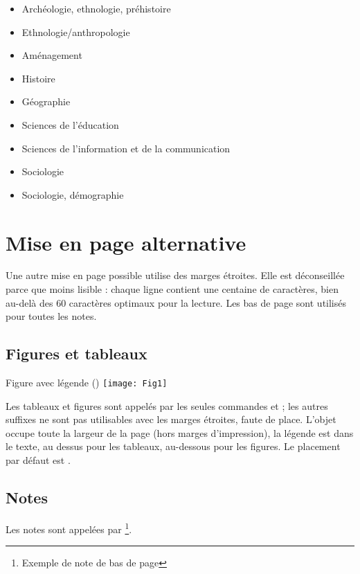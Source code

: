 \documentclass[
  a4paper, %
  11pt, extrafontsizes, %
  onecolumn, %
  openright, %
]{memoir}
\begin{document}
\begin{itemize}
  \item Archéologie, ethnologie, préhistoire 
  \item Ethnologie/anthropologie
  \item Aménagement
  \item Histoire
  \item Géographie
  \item Sciences de l’éducation
  \item Sciences de l’information et de la communication
  \item Sociologie
  \item Sociologie, démographie
\end{itemize}	




\clearpage
\SmallMargins
\chapter{Mise en page alternative}

Une autre mise en page possible utilise des marges étroites.
Elle est déconseillée parce que moins lisible : chaque ligne contient une centaine de caractères, bien au-delà des 60 caractères optimaux pour la lecture.
Les bas de page sont utilisés pour toutes les notes.


\section{Figures et tableaux}


{Figure avec légende ()}
{\texttt{[image: Fig1]}}

Les tableaux et figures sont appelés par les seules commandes  et ; les autres suffixes ne sont pas utilisables avec les marges étroites, faute de place.
L'objet occupe toute la largeur de la page (hors marges d'impression), la légende est dans le texte, au dessus pour les tableaux, au-dessous pour les figures. Le placement par défaut est \code{[tbp]}.


\section{Notes}

Les notes sont appelées par \footnote{Exemple de note de bas de page}.
\end{document}
